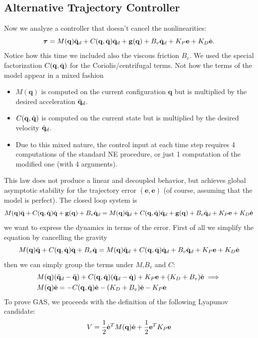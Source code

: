 \documentclass[10pt, a4paper]{report}
\newcommand{\q}{{\mathbf q}}
\begin{document}
\subsection{Alternative Trajectory Controller}
Now we analyze a controller that doesn't cancel the nonlinearities:\begin{equation}
    \btau=M(\q)\ddq_d+C(\q,\dq)\dq_d+\mathbf g(\q)+B_v\dq_d+K_P\mathbf e+K_D\dot{\mathbf e}.
\end{equation}
Notice how this time we included also the viscous friction $B_v$. We used the special factorization $C(\q,\dq)$ for the Coriolis/centrifugal terms. Not how the terms of the model appear in a mixed fashion\begin{itemize}
    \item $M(\q)$ is computed on the current configuration $\q$ but is multiplied by the desired acceleration ${\ddot{\mathbf q}}_d$.
    \item $C(\q,\dq)$ is computed on the current state  but is multiplied by the desired velocity ${\dot{\mathbf q}}_d$.
    \item Due to this mixed nature, the control input at each time step requires 4 computations of the standard NE procedure, or just 1 computation of the modified one (with 4 arguments).
\end{itemize}
This law does not produce a linear and decoupled behavior, but achieves global asymptotic stability for the trajectory error $(\mathbf e,\dot{\mathbf e})$ (of course, assuming that the model is perfect). The closed loop system is\begin{equation}
    M(\q)\ddq+C(\q,\dq)\dq+\mathbf g(\q)+B_v\dq_d
    =M(\q)\ddq_d+C(\q,\dq)\dq_d+\mathbf g(\q)+B_v\dq_d+K_P\mathbf e+K_D\dot{\mathbf e}
\end{equation}
we want to express the dynamics in terms of the error. First of all we simplify the equation by cancelling the gravity\begin{equation}
    M(\q)\ddq+C(\q,\dq)\dq+B_v\dq
    =M(\q)\ddq_d+C(\q,\dq)\dq_d+B_v\dq_d+K_P\mathbf e+K_D\dot{\mathbf e}
\end{equation}
then we can simply group the terms under $M$,$B_v$ and $C$:\begin{align}
    &M(\q)(\ddq_d-\ddq)+C(\q,\dq)(\dq_d-\dq)+K_P\mathbf e+(K_D+B_v)\dot{\mathbf e}\implies \\ 
    &M(\q)\ddot{\mathbf e}=-C(\q,\dq)\de-(K_D+B_v)\de-K_P\mathbf e\label{Mdde}
\end{align}
To prove GAS, we proceeds with the definition of the following Lyapunov candidate:\begin{equation}
    V=\frac{1}{2}\de^TM(\q)\de+\frac{1}{2}\mathbf e^TK_P\mathbf e
\end{equation}
\end{document}
